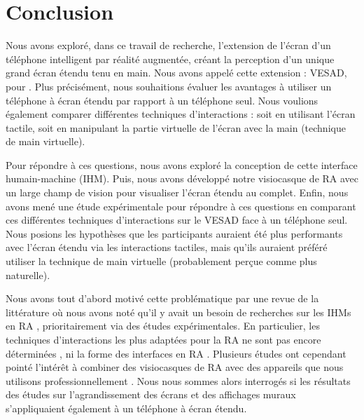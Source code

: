 \chapter*{Conclusion}
\label{ch:conclusion}

Nous avons exploré, dans ce travail de recherche, l'extension de l'écran d'un téléphone intelligent par réalité augmentée, créant la perception d'un unique grand écran étendu tenu en main. Nous avons appelé cette extension : VESAD, pour . Plus précisément, nous souhaitions évaluer les avantages à utiliser un téléphone à écran étendu par rapport à un téléphone seul. Nous voulions également comparer différentes techniques d'interactions : soit en utilisant l'écran tactile, soit en manipulant la partie virtuelle de l'écran avec la main (technique de main virtuelle).

Pour répondre à ces questions, nous avons exploré la conception de cette interface humain-machine (IHM). Puis, nous avons développé notre visiocasque de RA avec un large champ de vision pour visualiser l'écran étendu au complet. Enfin, nous avons mené une étude expérimentale pour répondre à ces questions en comparant ces différentes techniques d'interactions sur le VESAD face à un téléphone seul. Nous posions les hypothèses que les participants auraient été plus performants avec l'écran étendu via les interactions tactiles, mais qu'ils auraient préféré utiliser la technique de main virtuelle (probablement perçue comme plus naturelle).

Nous avons tout d'abord motivé cette problématique par une revue de la littérature  où nous avons noté qu'il y avait un besoin de recherches sur les IHMs en RA \citep{Billinghurst2005, Billinghurst2015}, prioritairement via des études expérimentales. En particulier, les techniques d'interactions les plus adaptées pour la RA ne sont pas encore déterminées \citep{Argelaguet2013, Piumsomboon2013, Piumsomboon2014}, ni la forme des interfaces en RA \citep{VanDam1997, Ens2014a, Serrano2015}. Plusieurs études ont cependant pointé l'intérêt à combiner des visiocasques de RA avec des appareils que nous utilisons professionnellement \citep{Grubert2015, Serrano2015a}. Nous nous sommes alors interrogés si les résultats des études sur l'agrandissement des écrans \citep{Baudisch2002, Guiard2004} et des affichages muraux \citep{Liu2014, Raedle2014} s'appliquaient également à un téléphone à écran étendu.

